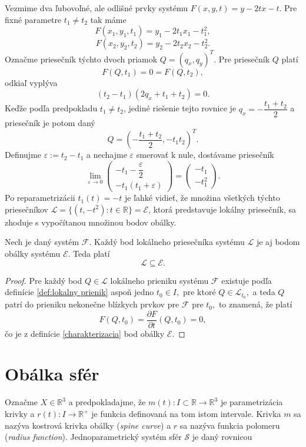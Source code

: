 \begin{example}
Vezmime dva ľubovoľné, ale odlišné prvky systému $F(x, y, t) = y - 2tx - t.$
Pre fixné parametre $t_1 \neq t_2$ tak máme
$$F(x_1, y_1, t_1) = y_1 - 2t_1x_1 - t_1^2,$$
$$F(x_2, y_2, t_2) = y_2 - 2t_2x_2 - t_2^2.$$ 
Označme priesečník týchto dvoch priamok $Q = (q_x, q_y)^T.$ Pre priesečník $Q$ platí $$F(Q, t_1) = 0 = F(Q, t_2),$$ odkiaľ vyplýva 
$$(t_2 - t_1)(2q_x + t_1 + t_2) = 0.$$ 
Keďže podľa predpokladu $t_1 \neq t_2$, jediné riešenie tejto rovnice je $q_x = -\dfrac{t_1 + t_2}{2}$ a priesečník je potom daný 
$$Q = (-\dfrac{t_1 + t_2}{2}, -t_1t_2)^T.$$ Definujme $\varepsilon := t_2 - t_1$ a nechajme $\varepsilon$ smerovať k nule, dostávame priesečník
$$
\lim_{\varepsilon \to 0} 
\begin{pmatrix} 
-t_1 - \dfrac{\varepsilon}{2} \\
-t_1(t_1 + \varepsilon)
\end{pmatrix} = \begin{pmatrix} 
-t_1 \\
-t_1^2
\end{pmatrix}.
$$
Po reparametrizácii $t_1(t) = -t$ je ľahké vidieť, že množina všetkých týchto priesečníkov $\mathcal{L} = \{(t, -t^2): t \in \mathbb{R}\} = \mathcal{E}$, ktorá predstavuje lokálny priesečník, sa zhoduje s vypočítanou množinou bodov obálky.
\end{example}

\begin{corollary} Nech je daný systém $\mathcal{F}$. Každý bod lokálneho priesečníka systému $\mathcal{L}$ je aj bodom obálky systému $\mathcal{E}$. Teda platí
$$ \mathcal{L} \subseteq \mathcal{E}. $$
\end{corollary}

\begin{proof}
Pre každý bod $Q \in \mathcal{L}$ lokálneho prieniku systému $\mathcal{F}$ existuje podľa definície \ref{def:lokalny prienik} aspoň jedno $t_0 \in I,$ pre ktoré $Q \in \mathcal{L}_{t_0}, $ a teda $Q$ patrí do prieniku nekonečne blízkych prvkov pre $\mathcal{F}$ pre $t_0,$ to znamená, že platí
$$ F(Q, t_0) = \dfrac{\partial F}{\partial t} (Q, t_0) = 0,
$$  
čo je z definície \ref{charakterizacia} bod obálky $\mathcal{E}.$
\end{proof}

\section{Obálka sfér}
Označme $X \in \mathbb{R}^3$ a predpokladajme, že $m(t) \colon I \subset \mathbb{R} \rightarrow \mathbb{R}^3$ je parametrizácia krivky a $r(t) \colon I \rightarrow \mathbb{R}^{+}$ je funkcia definovaná na tom istom intervale. Krivka $m$ sa nazýva kostrová krivka obálky (\textit{spine curve}) a $r$ sa nazýva funkcia polomeru (\textit{radius function}). Jednoparametrický systém sfér $\mathcal{S}$ je daný rovnicou

